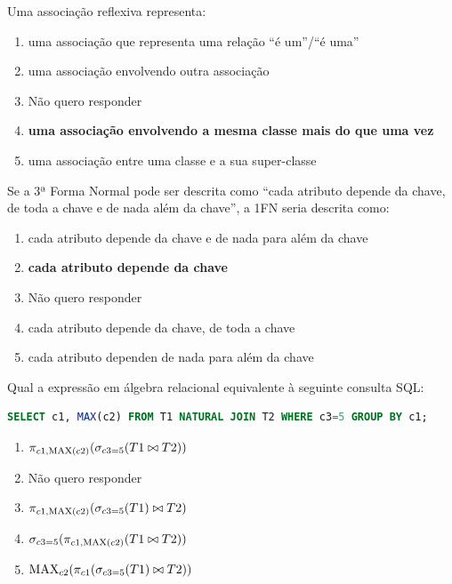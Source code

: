 \documentclass[type=normal, year=2015/16]{bdad_exam}
\begin{document}
{
\renewcommand{\thechapter}{\arabic{chapter}N}
\setcounter{chapter}{15}
Uma associação reflexiva representa:
\begin{enumerate}[label=\alph*.]\itemsep0em
    \item uma associação que representa uma relação ``é um''/``é uma''
    \item uma associação envolvendo outra associação
    \item Não quero responder
    \item \textbf{uma associação envolvendo a mesma classe mais do que uma vez \greencheckmark}
    \item uma associação entre uma classe e a sua super-classe
\end{enumerate}

Se a 3ª Forma Normal pode ser descrita como ``cada atributo depende da chave, de toda a chave e de nada além da chave'', a 1FN seria descrita como:
\begin{enumerate}[label=\alph*.]\itemsep0em
    \item cada atributo depende da chave e de nada para além da chave
    \item \textbf{cada atributo depende da chave \greencheckmark}
    \item Não quero responder
    \item cada atributo depende da chave, de toda a chave
    \item cada atributo dependen de nada para além da chave
\end{enumerate}

Qual a expressão em álgebra relacional equivalente à seguinte consulta SQL:
\begin{lstlisting}[language=SQL]
SELECT c1, MAX(c2) FROM T1 NATURAL JOIN T2 WHERE c3=5 GROUP BY c1;
\end{lstlisting}
\begin{enumerate}[label=\alph*.]\itemsep0em
    \item $\pi_{c1, \text{MAX}(c2)}(\sigma_{c3=5}(T1 \bowtie T2))$ \greencheckmark
    \item Não quero responder
    \item $\pi_{c1,\text{MAX}(c2)}(\sigma_{c3=5}(T1) \bowtie T2)$
    \item $\sigma_{c3=5}(\pi_{c1,\text{MAX}(c2)}(T1 \bowtie T2))$
    \item $\text{MAX}_{c2}(\pi_{c1}(\sigma_{c3=5}(T1) \bowtie T2))$
\end{enumerate}

}
\end{document}
